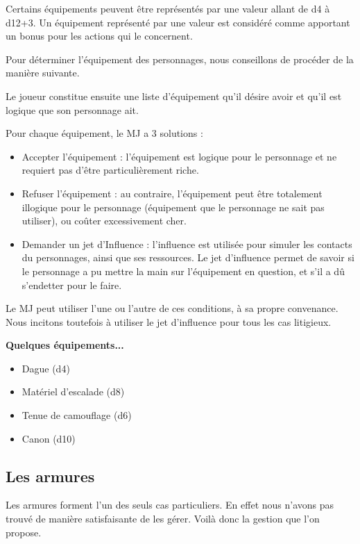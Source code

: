 \begin{multicols}{2}
Certains équipements peuvent être représentés par une valeur allant de d4 à d12+3. Un équipement représenté par une valeur est considéré comme apportant un bonus pour les actions qui le concernent.

Pour déterminer l'équipement des personnages, nous conseillons de procéder de la manière suivante.

Le joueur constitue ensuite une liste d'équipement qu'il désire avoir et qu'il est logique que son personnage ait.

Pour chaque équipement, le MJ a 3 solutions : 

\begin{itemize}
\item Accepter l'équipement : l'équipement est logique pour le personnage et ne requiert pas d'être particulièrement riche. 
\item Refuser l'équipement : au contraire, l'équipement peut être totalement illogique pour le personnage (équipement que le personnage ne sait pas utiliser), ou coûter excessivement cher.
\item Demander un jet d'Influence : l'influence est utilisée pour simuler les contacts du personnages, ainsi que ses ressources. Le jet d'influence permet de savoir si le personnage a pu mettre la main sur l'équipement en question, et s'il a dû s'endetter pour le faire.
\end{itemize}

Le MJ peut utiliser l'une ou l'autre de ces conditions, à sa propre convenance. Nous incitons toutefois à utiliser le jet d'influence pour tous les cas litigieux.


\textbf{Quelques équipements...}

    \begin{itemize}
        \item Dague (d4)
        \item Matériel d'escalade (d8)
        \item Tenue de camouflage (d6)
        \item Canon (d10)
    \end{itemize}

\subsection{Les armures}

Les armures forment l'un des seuls cas particuliers. En effet nous n'avons pas trouvé de manière satisfaisante de les gérer. Voilà donc la gestion que l'on propose. 


\end{multicols}

